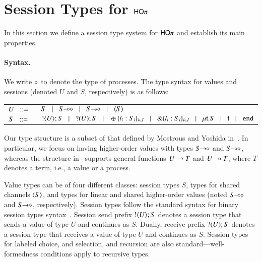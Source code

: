\newcommand{\jrule}[3]{\displaystyle \trule{#3}~~\frac{#1 }{#2}}
\newcommand{\addenv}{\circ}

\section{Session Types for $\mathsf{HO}\pi$}\label{s:types}
In this section we define a session type system for $\mathsf{HO}\pi$ and establish its main properties. 

\paragraph{Syntax.}
We write $\diamond$ to denote the type of processes.
The type syntax for values  and sessions (denoted $U$ and $S$, respectively) is as follows:

\begin{tabular}{cl}
 $U \;\;::=\;\; $ & $S \bnfbar \lhot{S} \bnfbar \shot{S} \bnfbar \chtype{S}$ \\
$S \;\;::=\;\;$ & $! \langle U \rangle ; S \;\;\;|\;\;\; ? (U) ; S
				\;\;\;|\;\;\; \oplus \{l_i:S_i\}_{i \in I} \;\;\;|\;\;\; \& \{l_i:S_i\}_{i \in I}
				 \;\;\;|\;\;\; \mu\mathsf{t}.S \;\;\;|\;\;\; \mathsf{t}  \;\;\;|\;\;\; \mathtt{end}$
\end{tabular}

\noindent 
Our type structure is a subset of that defined by Mostrous and Yoshida in~\cite{tlca07}.
In particular, we focus on having higher-order values with types
$S\!\! \rightarrow\!\! \diamond$ and $S\!\! \multimap\!\! \diamond$, whereas the structure in~\cite{tlca07} supports general functions $U \rightarrow T$ and 
$U \multimap T$, where $T$ denotes a term, i.e., a value or a process.

Value types can be of four different classes: session types $S$, 
types for shared channels $\langle S \rangle$, and types for linear and shared higher-order values (noted $S\!\! \multimap\!\! \diamond$ and $S\!\! \rightarrow\!\! \diamond$, respectively).
Session types follow the standard syntax for binary session types syntax~\cite{}. Session send prefix $! \langle U \rangle ; S$ 
denotes a session type that sends a value of type $U$ and continues as $S$. Dually, receive prefix $? (U) ; S$
denotes a session type that receives a value of type $U$ and continues as $S$. 
Session types for labeled choice, and selection, and recursion are also standard---well-formedness conditions apply to recursive types.

